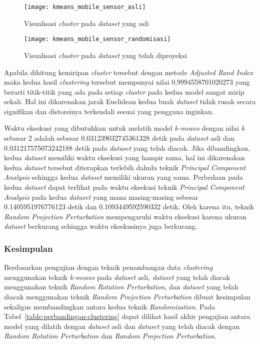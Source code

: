\begin{figure}
	\centering
	\texttt{[image: kmeans\_mobile\_sensor\_asli]}
	\caption{Visualisasi \textit{cluster} pada \textit{dataset} yang asli}
	\label{fig:kmeans_mobile_sensor_asli}
\end{figure}

\begin{figure}
	\centering
	\texttt{[image: kmeans\_mobile\_sensor\_randomisasi]}
	\caption{Visualisasi \textit{cluster} pada \textit{dataset} yang telah diproyeksi}
	\label{fig:kmeans_mobile_sensor_randomisasi}
\end{figure}
	
Apabila dihitung kemiripan \textit{cluster} tersebut dengan metode \textit{Adjusted Rand Index} maka kedua hasil \textit{clustering} tersebut mempunyai nilai 0.9994558701020273 yang berarti titik-titik yang ada pada setiap \textit{cluster} pada kedua model sangat mirip sekali. Hal ini dikarenakan jarak Euclidean kedua buah \textit{dataset} tidak rusak secara signifikan dan distorsinya terkendali sesuai yang pengguna inginkan.

Waktu eksekusi yang dibutuhkan untuk melatih model \textit{k-means} dengan nilai \textit{k} sebesar 2 adalah sebesar 0.031239032745361328 detik pada \textit{dataset} asli dan 0.031217575073242188 detik pada \textit{dataset} yang telah diacak. Jika dibandingkan, kedua \textit{dataset} memiliki waktu eksekusi yang hampir sama, hal ini dikarenakan kedua \textit{dataset} tersebut diterapkan terlebih dahulu teknik \textit{Principal Component Analysis} sehingga kedua \textit{dataset} memiliki ukuran yang sama. Perbedaan pada kedua \textit{dataset} dapat terlihat pada waktu eksekusi teknik \textit{Principal Component Analysis} pada kedua \textit{dataset} yang mana masing-masing sebesar 0.1405951976776123 detik dan 0.1093449592590332 detik. Oleh karena itu, teknik \textit{Random Projection Perturbation} mempengaruhi waktu eksekusi karena ukuran \textit{dataset} berkurang sehingga waktu eksekusinya juga berkurang.

\subsubsection{Kesimpulan}
\label{subsubsec:pengujian-clustering-kesimpulan}

Berdasarkan pengujian dengan teknik penambangan data \textit{clustering} menggunakan teknik \textit{k-means} pada \textit{dataset} asli, \textit{dataset} yang telah diacak menggunakan teknik \textit{Random Rotation Perturbation}, dan \textit{dataset} yang telah diacak menggunakan teknik \textit{Random Projection Perturbation} dibuat kesimpulan sekaligus membandingkan antara kedua teknik \textit{Randomization}. Pada Tabel~\ref{table:perbandingan-clustering} dapat dilihat hasil akhir pengujian antara model yang dilatih dengan \textit{dataset} asli dan \textit{dataset} yang telah diacak dengan \textit{Random Rotation Perturbation} dan \textit{Random Projection Perturbation}.

